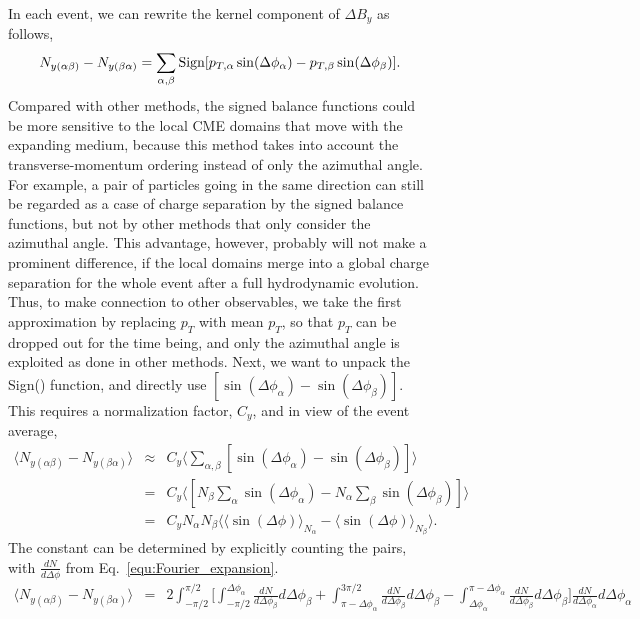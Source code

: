 \begin{figure}[htbp]
In each event, we can rewrite the kernel component of $\Delta B_y$ as follows,
\begin{equation}
N_{y(\alpha\beta)}-N_{y(\beta\alpha)} = \sum_{\alpha,\beta} {\rm Sign}[p_{T,\alpha}\sin(\Delta\phi_\alpha)-p_{T,\beta}\sin(\Delta\phi_\beta)].    
\end{equation}
Compared with other methods, the signed balance functions could be more sensitive to the local CME domains that move with the expanding medium, because this method takes into account the transverse-momentum ordering instead of only the azimuthal angle. For example, a pair of particles going in the same direction can still be regarded as a case of charge separation by the signed balance functions, but not by other methods that only consider the azimuthal angle. This advantage, however, probably will not make a prominent difference, if the local domains merge into a global charge separation for the whole event after a full hydrodynamic evolution. Thus, to make connection to other observables, we take the first approximation by replacing $p_T$ with mean $p_T$, so that $p_T$ can be dropped out for the time being, and  only the azimuthal angle is exploited as done in other methods. Next, we want to unpack the Sign() function, and directly use $[\sin(\Delta\phi_\alpha) - \sin(\Delta\phi_\beta)]$. This requires a normalization factor, $C_y$, and in view of the event average,
\begin{eqnarray}
\langle N_{y(\alpha\beta)}-N_{y(\beta\alpha)} \rangle &\approx& C_y \Big\langle \sum_{\alpha,\beta} [\sin(\Delta\phi_\alpha) - \sin(\Delta\phi_\beta)] \Big\rangle \nonumber \\
&=& C_y \Big\langle [N_\beta \sum_{\alpha}\sin(\Delta\phi_\alpha) - N_\alpha \sum_{\beta}\sin(\Delta\phi_\beta)] \Big\rangle \nonumber \\
&=& C_y N_\alpha N_\beta \langle \langle \sin(\Delta \phi)\rangle _{N_\alpha}-\langle \sin(\Delta\phi)\rangle_{N_\beta} \rangle. \label{eq:constant}
\end{eqnarray}
The constant can be determined by explicitly counting the pairs, with $\frac{dN}{d\Delta\phi}$ from Eq.~\ref{equ:Fourier_expansion}.
\begin{eqnarray}
\langle N_{y(\alpha\beta)}-N_{y(\beta\alpha)} \rangle &=& 2\int_{-\pi/2}^{\pi/2} 
\Big[\int_{-\pi/2}^{\Delta\phi_\alpha} \frac{dN}{d\Delta\phi_\beta}d\Delta\phi_\beta+\int_{\pi-\Delta\phi_\alpha}^{3\pi/2} \frac{dN}{d\Delta\phi_\beta}d\Delta\phi_\beta-\int^{\pi-\Delta\phi_\alpha}_{\Delta\phi_\alpha} \frac{dN}{d\Delta\phi_\beta}d\Delta\phi_\beta\Big]\frac{dN}{d\Delta\phi_\alpha}d\Delta\phi_\alpha \nonumber \\

\end{eqnarray}
\end{figure}
